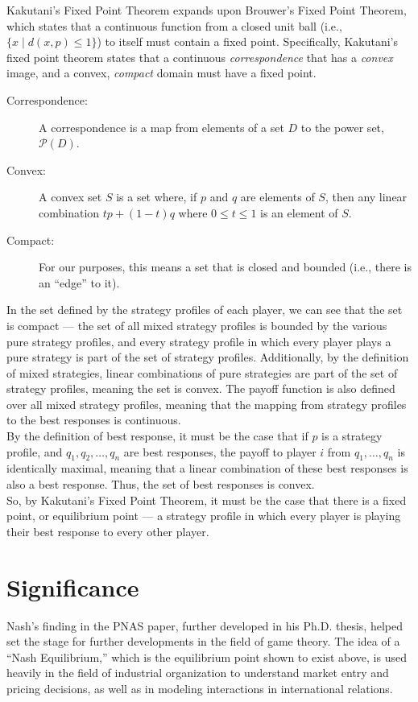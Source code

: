 \documentclass[12pt]{extarticle}
\begin{document}
  Kakutani's Fixed Point Theorem expands upon Brouwer's Fixed Point Theorem, which states that a continuous function from a closed unit ball (i.e., $\{x\mid d(x,p) \leq 1\}$) to itself must contain a fixed point.\supercite{brouwer_fixed_point} Specifically, Kakutani's fixed point theorem states that a continuous \textit{correspondence} that has a \textit{convex} image, and a convex, \textit{compact} domain must have a fixed point.\supercite{kakutani_fixed_point}
  \begin{description}
    \item[Correspondence:] A correspondence is a map from elements of a set $D$ to the power set, $\mathcal{P}(D)$.
    \item[Convex:] A convex set $S$ is a set where, if $p$ and $q$ are elements of $S$, then any linear combination $tp + (1-t)q$ where $0\leq t \leq 1$ is an element of $S$.\supercite{convex_definition}
    \item[Compact:] For our purposes, this means a set that is closed and bounded (i.e., there is an ``edge'' to it).
  \end{description}
  In the set defined by the strategy profiles of each player, we can see that the set is compact --- the set of all mixed strategy profiles is bounded by the various pure strategy profiles, and every strategy profile in which every player plays a pure strategy is part of the set of strategy profiles. Additionally, by the definition of mixed strategies, linear combinations of pure strategies are part of the set of strategy profiles, meaning the set is convex. The payoff function is also defined over all mixed strategy profiles, meaning that the mapping from strategy profiles to the best responses is continuous.\\

  By the definition of best response, it must be the case that if $p$ is a strategy profile, and $q_1,q_2,\dots,q_n$ are best responses, the payoff to player $i$ from $q_1,\dots,q_n$ is identically maximal, meaning that a linear combination of these best responses is also a best response. Thus, the set of best responses is convex.\\

  So, by Kakutani's Fixed Point Theorem, it must be the case that there is a fixed point, or equilibrium point --- a strategy profile in which every player is playing their best response to every other player.
  \section*{Significance}%
  Nash's finding in the PNAS paper, further developed in his Ph.D. thesis, helped set the stage for further developments in the field of game theory. The idea of a ``Nash Equilibrium,'' which is the equilibrium point shown to exist above, is used heavily in the field of industrial organization to understand market entry and pricing decisions, as well as in modeling interactions in international relations.\\
\end{document}
